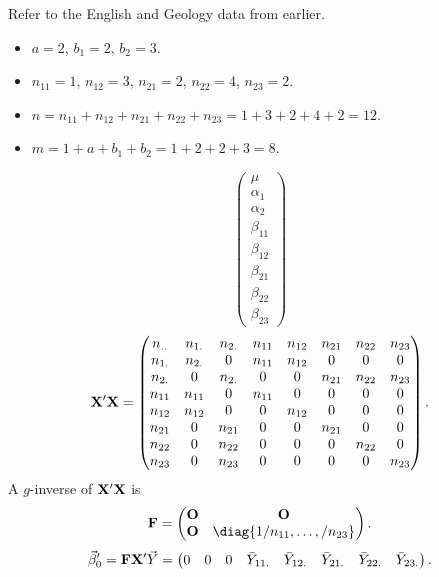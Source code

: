 \begin{Example}{}{}
    Refer to the English and Geology data from earlier.
    \begin{itemize}
        \item $ a=2 $, $ b_1=2 $, $ b_2=3 $.
        \item $ n_{11}=1 $, $ n_{12}=3 $, $ n_{21}=2 $, $ n_{22}=4 $, $ n_{23}=2 $.
        \item $ n=n_{11}+n_{12}+n_{21}+n_{22}+n_{23}=1+3+2+4+2=12 $.
        \item $ m=1+a+b_1+b_2=1+2+2+3=8 $.
    \end{itemize}
    \[ \begin{pmatrix}
            \mu        \\
            \alpha_1   \\
            \alpha_2   \\
            \beta_{11} \\
            \beta_{12} \\
            \beta_{21} \\
            \beta_{22} \\
            \beta_{23}
        \end{pmatrix} \]
    \[ \mathbf{X}'\mathbf{X}=\begin{pmatrix}
            n_{..} & n_{1.} & n_{2.} & n_{11} & n_{12} & n_{21} & n_{22} & n_{23} \\
            n_{1.} & n_{2.} & 0      & n_{11} & n_{12} & 0      & 0      & 0      \\
            n_{2.} & 0      & n_{2.} & 0      & 0      & n_{21} & n_{22} & n_{23} \\
            n_{11} & n_{11} & 0      & n_{11} & 0      & 0      & 0      & 0      \\
            n_{12} & n_{12} & 0      & 0      & n_{12} & 0      & 0      & 0      \\
            n_{21} & 0      & n_{21} & 0      & 0      & n_{21} & 0      & 0      \\
            n_{22} & 0      & n_{22} & 0      & 0      & 0      & n_{22} & 0      \\
            n_{23} & 0      & n_{23} & 0      & 0      & 0      & 0      & n_{23}
        \end{pmatrix}. \]
    A $ g $-inverse of $ \mathbf{X}'\mathbf{X} $ is
    \[ \Matrix{F}=\begin{pmatrix}
            \Matrix{O} & \Matrix{O}                     \\
            \Matrix{O} & \diag{1/n_{11},\ldots,/n_{23}}
        \end{pmatrix}. \]
    \[ \vec{\beta}_0'=\mathbf{F}\mathbf{X}'\vec{Y}=\begin{pmatrix}
            0 & 0 & 0 & \bar{Y}_{11.} & \bar{Y}_{12.} & \bar{Y}_{21.} & \bar{Y}_{22.} & \bar{Y}_{23.}
        \end{pmatrix}. \]
\end{Example}

